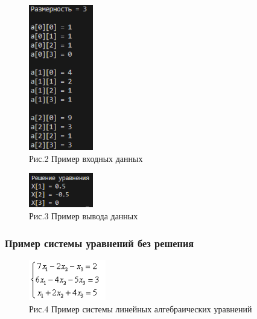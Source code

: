 \documentclass[12pt,a4paper]{scrartcl}
\begin{document}
\begin{figure}
  \begin{center}
    \includegraphics[width=0.25\textwidth]{vhoddan1.png}
  \end{center}
  \caption{Рис.2  Пример входных данных}\label{fig:ex}
\end{figure}

\begin{figure}
  \begin{center}
    \includegraphics[width=0.25\textwidth]{imeetresh.png}
  \end{center}
  \caption{Рис.3  Пример вывода данных}\label{fig:ex}
\end{figure}

\newpage
\subsubsection{Пример системы уравнений без решения}

\begin{figure}
  \begin{center}
    \includegraphics[width=0.3\textwidth]{netresh.png}
  \end{center}
  \caption{Рис.4  Пример системы линейных алгебраических уравнений}\label{fig:ex}
\end{figure}
\end{document}
